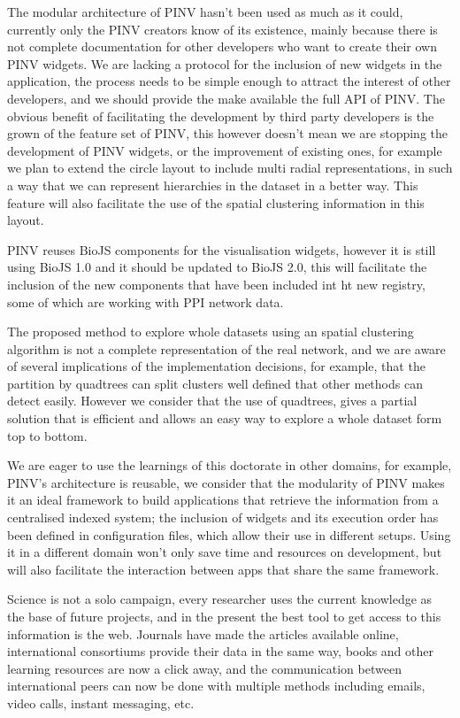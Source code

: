 The modular architecture of PINV hasn't been used as much as it could, currently only the PINV creators know of its existence, mainly because there is not complete documentation for other developers who want to create their own PINV widgets. We are lacking a protocol for the inclusion of new widgets in the application, the process needs to be simple enough to attract the interest of other developers, and we should provide the make available the full API of PINV. The obvious benefit of facilitating the development by third party developers is the grown of the feature set of PINV, this however doesn't mean we are stopping the development of PINV widgets, or the improvement of existing ones, for example we plan to extend the circle layout to include multi radial representations, in such a way that we can represent hierarchies in the dataset in a better way. This feature will also facilitate the use of the spatial clustering information in this layout.

PINV reuses BioJS components for the visualisation widgets, however it is still using BioJS 1.0 and it should be updated to BioJS 2.0, this will facilitate the inclusion of the new components that have been included int ht new registry, some of which are working with PPI network data.

The proposed method to explore whole datasets using an spatial clustering algorithm is not a complete representation of the real network, and we are aware of several implications of the implementation decisions, for example, that the partition by quadtrees can split clusters well defined that other methods can detect easily. However we consider that the use of quadtrees, gives a partial solution that is efficient and allows an easy way to explore a whole dataset form top to bottom.

We are eager to use the learnings of this doctorate in other domains, for example, PINV's architecture is reusable, we consider that the modularity of PINV makes it an ideal framework to build applications that retrieve the information from a centralised indexed system; the inclusion of widgets and its execution order has been defined in configuration files, which allow their use in different setups. Using it in a different domain won't only save time and resources on development, but will also facilitate the interaction between apps that share the same framework.

\vspace{5mm}

Science is not a solo campaign, every researcher uses the current knowledge as the base of future projects, and in the present the best tool to get access to this information is the web. Journals have made the articles available online, international consortiums provide their data in the same way, books and other learning resources are now a click away, and the communication between international peers can now be done with multiple methods including emails, video calls, instant messaging, etc.

